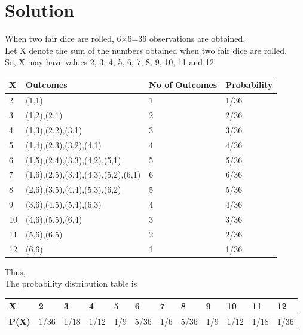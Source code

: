 \documentclass[journal,12pt,twocolumn]{IEEEtran}
\begin{document}
\section{Solution}
When two fair dice are rolled, 6×6=36 observations are obtained.\\
Let X denote the sum of the numbers obtained when two fair dice are rolled.\\
So, X may have values 2, 3, 4, 5, 6, 7, 8, 9, 10, 11 and 12
\\
\begin{center}
 \begin{table}[ht]
\begin{tabular}{|l|l|l|l|}
\hline
\textbf{X}    &\textbf{Outcomes}    & \textbf{No of Outcomes}   & \textbf{Probability}  \\ \hline
2 & (1,1) & 1 & 1/36 \\ \hline
3 & (1,2),(2,1) & 2 & 2/36 \\ \hline
4 & (1,3),(2,2),(3,1) & 3 & 3/36 \\ \hline
5 & (1,4),(2,3),(3,2),(4,1) & 4 & 4/36\\\hline
6 & (1,5),(2,4),(3,3),(4,2),(5,1) & 5 & 5/36 \\\hline
7 & (1,6),(2,5),(3,4),(4,3),(5,2),(6,1) & 6 & 6/36 \\\hline
8 & (2,6),(3,5),(4,4),(5,3),(6,2) & 5 & 5/36 \\\hline
9 & (3,6),(4,5),(5,4),(6,3) & 4 & 4/36 \\\hline
10 & (4,6),(5,5),(6,4) & 3 & 3/36 \\\hline
11 & (5,6),(6,5) & 2 & 2/36 \\\hline
12 & (6,6) & 1 & 1/36 \\  \hline
\end{tabular}
\end{table}
\end{center}
Thus,\\
The probability distribution table is \\
\begin{center}
 \begin{table}[ht]
\begin{tabular}{|l|l|l|l|l|l|l|l|l|l|l|l|}
\hline
\textbf{X}    &2    & 3   & 4   & 5    & 6   & 7    & 8   &9    & 10    & 11    &12       \\ \hline
\textbf{P(X)} & 1/36 & 1/18 & 1/12 & 1/9  & 5/36 & 1/6 & 5/36 & 1/9 & 1/12 & 1/18 & 1/36 \\ \hline
\end{tabular}
\end{table}
\end{center}
\end{document}
